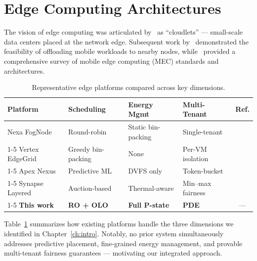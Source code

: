 \section{Edge Computing Architectures}

The vision of edge computing was articulated by~\citet{satyanarayanan2009case}
as ``cloudlets'' --- small-scale data centers placed at the network edge.
Subsequent work by~\citet{ha2014towards} demonstrated the feasibility of
offloading mobile workloads to nearby nodes, while~\citet{mao2017survey}
provided a comprehensive survey of mobile edge computing (MEC) standards and
architectures.

\begin{table}[htbp]
\centering
\singlespacing
\caption{Representative edge platforms compared across key dimensions.}
\label{tab:platforms}
\begin{tabularx}{0.92\textwidth}{p{2.6cm} X X X c}
\toprule
\textbf{Platform} & \textbf{Scheduling} & \textbf{Energy Mgmt} & \textbf{Multi-Tenant} & \textbf{Ref.} \\
\midrule
Nexa FogNode & Round-robin & Static bin-packing & Single-tenant & \cite{bonomi2012fog} \\
\cmidrule{1-5}
Vertex EdgeGrid & Greedy bin-packing & None & Per-VM isolation & \cite{yi2015survey} \\
\cmidrule{1-5}
Apex Nexus & Predictive ML & DVFS only & Token-bucket & \cite{shi2016edge} \\
\cmidrule{1-5}
Synapse Layered & Auction-based & Thermal-aware & Min--max fairness & \cite{mach2017mobile} \\
\cmidrule{1-5}
\textbf{This work} & \textbf{RO + OLO} & \textbf{Full P-state} & \textbf{PDE} & --- \\
\bottomrule
\end{tabularx}
\end{table}

Table~\ref{tab:platforms} summarizes how existing platforms handle the three
dimensions we identified in Chapter~\ref{ch:intro}. Notably, no prior system
simultaneously addresses predictive placement, fine-grained energy management,
and provable multi-tenant fairness guarantees --- motivating our integrated
approach.
